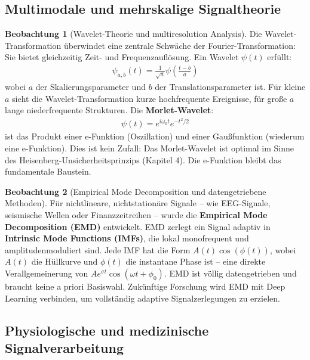 ﻿\documentclass[a4paper,12pt]{report}
\theoremstyle{definition}
\newtheorem{beobachtung}{Beobachtung}
\begin{document}
	\subsection{Multimodale und mehrskalige Signaltheorie}
	
	\begin{beobachtung}[Wavelet-Theorie und multiresolution Analysis]
		Die Wavelet-Trans\-formation überwindet eine zentrale Schwäche der Fourier-Transformation: Sie bietet gleichzeitig Zeit- und Frequenzauflösung. Ein Wavelet $\psi(t)$ erfüllt:
		\begin{align}
			\psi_{a,b}(t) = \frac{1}{\sqrt{a}} \psi\left(\frac{t-b}{a}\right)
		\end{align}
		wobei $a$ der Skalierungsparameter und $b$ der Translationsparameter ist. Für kleine $a$ sieht die Wavelet-Transformation kurze hochfrequente Ereignisse, für große $a$ lange niederfrequente Strukturen. Die \textbf{Morlet-Wavelet}:
		\begin{align}
			\psi(t) = e^{i\omega_0 t} e^{-t^2/2}
		\end{align}
		ist das Produkt einer e-Funktion (Oszillation) und einer Gaußfunktion (wiederum eine e-Funktion). Dies ist kein Zufall: Das Morlet-Wavelet ist optimal im Sinne des Heisenberg-Unsicherheitsprinzips (Kapitel 4). Die e-Funktion bleibt das fundamen\-tale Baustein.
	\end{beobachtung}
	
	\begin{beobachtung}[Empirical Mode Decomposition und datengetriebene Methoden]
		Für nichtlineare, nichtstationäre Signale -- wie EEG-Signale, seismische Wellen oder Finanzzeitreihen -- wurde die \textbf{Empirical Mode Decomposition (EMD)} entwickelt. EMD zerlegt ein Signal adaptiv in \textbf{Intrinsic Mode Functions (IMFs)}, die lokal monofrequent und amplitudenmoduliert sind. Jede IMF hat die Form $A(t) \cos(\phi(t))$, wobei $A(t)$ die Hüllkurve und $\phi(t)$ die instantane Phase ist -- eine direkte Verallgemeinerung von $A e^{\sigma t} \cos(\omega t + \phi_0)$. EMD ist völlig datengetrieben und braucht keine a priori Basiswahl. Zukünftige Forschung wird EMD mit Deep Learning verbinden, um vollständig adaptive Signalzerlegungen zu erzielen.
	\end{beobachtung}
	
	\subsection{Physiologische und medizinische Signalverarbeitung}
	
\end{document}
